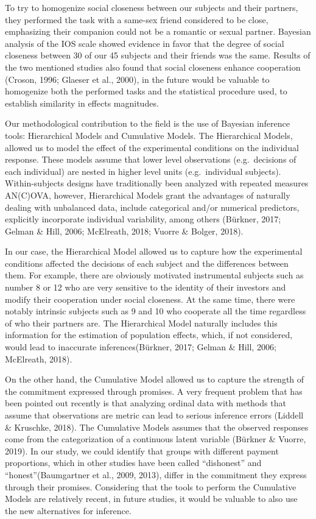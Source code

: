 \documentclass[12pt,]{article}
\begin{document}
To try to homogenize social closeness between our subjects and their
partners, they performed the task with a same-sex friend considered to
be close, emphasizing their companion could not be a romantic or sexual
partner. Bayesian analysis of the IOS scale showed evidence in favor
that the degree of social closeness between 30 of our 45 subjects and
their friends was the same. Results of the two mentioned studies also
found that social closeness enhance cooperation (Croson, 1996; Glaeser
et al., 2000), in the future would be valuable to homogenize both the
performed tasks and the statistical procedure used, to establish
similarity in effects magnitudes.

Our methodological contribution to the field is the use of Bayesian
inference tools: Hierarchical Models and Cumulative Models. The
Hierarchical Models, allowed us to model the effect of the experimental
conditions on the individual response. These models assume that lower
level observations (e.g.~decisions of each individual) are nested in
higher level units (e.g.~individual subjects). Within-subjects designs
have traditionally been analyzed with repeated measures AN(C)OVA,
however, Hierarchical Models grant the advantages of naturally dealing
with unbalanced data, include categorical and/or numerical predictors,
explicitly incorporate individual variability, among others (Bürkner,
2017; Gelman \& Hill, 2006; McElreath, 2018; Vuorre \& Bolger, 2018).

In our case, the Hierarchical Model allowed us to capture how the
experimental conditions affected the decisions of each subject and the
differences between them. For example, there are obviously motivated
instrumental subjects such as number 8 or 12 who are very sensitive to
the identity of their investors and modify their cooperation under
social closeness. At the same time, there were notably intrinsic
subjects such as 9 and 10 who cooperate all the time regardless of who
their partners are. The Hierarchical Model naturally includes this
information for the estimation of population effects, which, if not
considered, would lead to inaccurate inferences(Bürkner, 2017; Gelman \&
Hill, 2006; McElreath, 2018).

On the other hand, the Cumulative Model allowed us to capture the
strength of the commitment expressed through promises. A very frequent
problem that has been pointed out recently is that analyzing ordinal
data with methods that assume that observations are metric can lead to
serious inference errors (Liddell \& Kruschke, 2018). The Cumulative
Models assumes that the observed responses come from the categorization
of a continuous latent variable (Bürkner \& Vuorre, 2019). In our study,
we could identify that groups with different payment proportions, which
in other studies have been called ``dishonest'' and
``honest''(Baumgartner et al., 2009, 2013), differ in the commitment
they express through their promises. Considering that the tools to
perform the Cumulative Models are relatively recent, in future studies,
it would be valuable to also use the new alternatives for inference.
\end{document}
